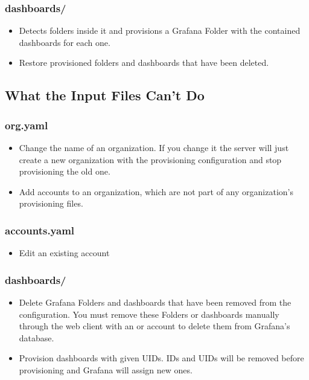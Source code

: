 \documentclass[letterpaper,10pt,english]{sphinxmanual}
\begin{document}
\subsubsection{dashboards/}
\label{\detokenize{inputStructure:dashboards}}\begin{itemize}
\item {} 
Detects folders inside it and provisions a Grafana Folder with the contained
dashboards for each one.

\item {} 
Restore provisioned folders and dashboards that have been deleted.

\end{itemize}


\subsection{What the Input Files Can’t Do}
\label{\detokenize{inputStructure:what-the-input-files-can-t-do}}

\subsubsection{org.yaml}
\label{\detokenize{inputStructure:id2}}\begin{itemize}
\item {} 
Change the name of an organization. If you change it the server will just
create a new organization with the provisioning configuration and stop
provisioning the old one.

\item {} 
Add accounts to an organization, which are not part of any organization’s
provisioning files.

\end{itemize}


\subsubsection{accounts.yaml}
\label{\detokenize{inputStructure:id3}}\begin{itemize}
\item {} 
Edit an existing account

\end{itemize}


\subsubsection{dashboards/}
\label{\detokenize{inputStructure:id4}}\begin{itemize}
\item {} 
Delete Grafana Folders and dashboards that have been removed from the
configuration. You must remove these Folders or dashboards manually through
the web client with an  or  account to delete them from
Grafana’s database.

\item {} 
Provision dashboards with given UIDs. IDs and UIDs will be removed before
provisioning and Grafana will assign new ones.

\end{itemize}
\end{document}
